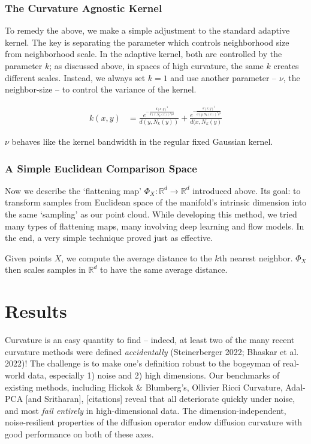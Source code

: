 \documentclass[
  letterpaper,
  DIV=11,
  numbers=noendperiod]{scrartcl}
\theoremstyle{plain}
\theoremstyle{plain}
\theoremstyle{definition}
\theoremstyle{plain}
\theoremstyle{definition}
\theoremstyle{remark}
\begin{document}
\subsubsection{The Curvature Agnostic
Kernel}\label{the-curvature-agnostic-kernel}

To remedy the above, we make a simple adjustment to the standard
adaptive kernel. The key is separating the parameter which controls
neighborhood size from neighborhood scale. In the adaptive kernel, both
are controlled by the parameter \(k\); as discussed above, in spaces of
high curvature, the same \(k\) creates different scales. Instead, we
always set \(k = 1\) and use another parameter -- \(\nu\), the
neighbor-size -- to control the variance of the kernel.

\[
\begin{aligned}
k(x, y) & =\frac{e^{-\frac{d(x, y)^2}{d(x, N_{k}(x))^2\nu^2}}}{d(y, N_{k}(y))}
+\frac{e^{-\frac{d(x, y)^2}{d(y, N_{k}(x))^2\nu^2}}}{d(x, N_{k}(y)}
\end{aligned}
\]

\(\nu\) behaves like the kernel bandwidth in the regular fixed Gaussian
kernel.

\subsubsection{A Simple Euclidean Comparison
Space}\label{a-simple-euclidean-comparison-space}

Now we describe the `flattening map'
\(\Phi_{X}: \mathbb{R}^d \to \mathbb{R}^d\) introduced above. Its goal:
to transform samples from Euclidean space of the manifold's intrinsic
dimension into the same `sampling' as our point cloud. While developing
this method, we tried many types of flattening maps, many involving deep
learning and flow models. In the end, a very simple technique proved
just as effective.

Given points \(X\), we compute the average distance to the \(k\)th
nearest neighbor. \(\Phi_{X}\) then scales samples in \(\mathbb{R}^d\)
to have the same average distance.

\section{Results}\label{results}

Curvature is an easy quantity to find -- indeed, at least two of the
many recent curvature methods were defined \emph{accidentally}
(Steinerberger 2022; Bhaskar et al. 2022)! The challenge is to make
one's definition robust to the bogeyman of real-world data, especially
1) noise and 2) high dimensions. Our benchmarks of existing methods,
including Hickok \& Blumberg's, Ollivier Ricci Curvature, Adal-PCA
{[}and Sritharan{]}, {[}citations{]} reveal that all deteriorate quickly
under noise, and most \emph{fail entirely} in high-dimensional data. The
dimension-independent, noise-resilient properties of the diffusion
operator endow diffusion curvature with good performance on both of
these axes.
\end{document}
